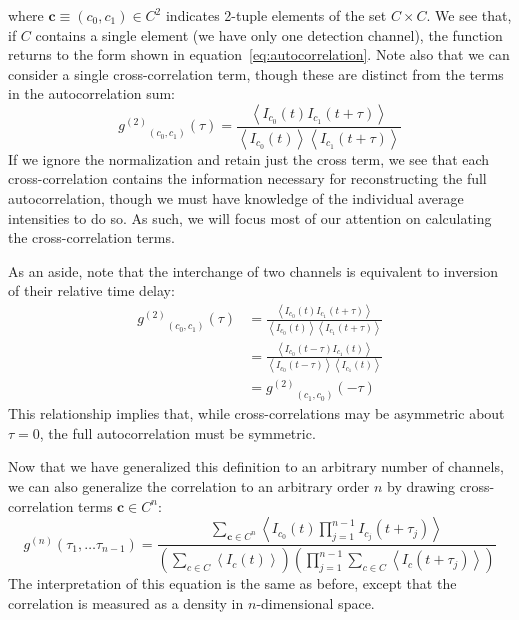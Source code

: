 \documentclass{article}
\newcommand{\angles}[1]{\ensuremath{\left\langle #1 \right\rangle}}
\newcommand{\gn}[1]{\ensuremath{g^{(#1)}}}
\renewcommand{\vec}{\boldsymbol}
\newcommand{\channel}{\ensuremath{c}}
\newcommand{\channels}{\ensuremath{C}}
\begin{document}
where $\vec{\channel}\equiv(\channel_{0},\channel_{1})\in\channels^{2}$ indicates 2-tuple elements of the set $\channels\times\channels$. We see that, if $\channels$ contains a single element (we have only one detection channel), the function returns to the form shown in equation~\ref{eq:autocorrelation}. Note also that we can consider a single cross-correlation term, though these are distinct from the terms in the autocorrelation sum:
\begin{equation}
\gn{2}_{(c_{0},c_{1})}(\tau)=\frac{\angles{I_{c_{0}}(t)I_{c_{1}}(t+\tau)}}
                                                {\angles{I_{c_{0}}(t)}\angles{I_{c_{1}}(t+\tau)}}
\end{equation}
If we ignore the normalization and retain just the cross term, we see that each cross-correlation contains the information necessary for reconstructing the full autocorrelation, though we must have knowledge of the individual average intensities to do so. As such, we will focus most of our attention on calculating the cross-correlation terms.

As an aside, note that the interchange of two channels is equivalent to inversion of their relative time delay:
\begin{align}
\gn{2}_{(c_{0},c_{1})}(\tau)&=\frac{\angles{I_{c_{0}}(t)I_{c_{1}}(t+\tau)}}
                                                {\angles{I_{c_{0}}(t)}\angles{I_{c_{1}}(t+\tau)}} \\
                            &=\frac{\angles{I_{c_{0}}(t-\tau)I_{c_{1}}(t)}}
                                                {\angles{I_{c_{0}}(t-\tau)}\angles{I_{c_{1}}(t)}} \\
                            &= \gn{2}_{(c_{1}, c_{0})}(-\tau)
\end{align}
This relationship implies that, while cross-correlations may be asymmetric about $\tau=0$, the full autocorrelation must be symmetric. 

Now that we have generalized this definition to an arbitrary number of channels, we can also generalize the correlation to an arbitrary order $n$ by drawing cross-correlation terms $\vec{\channel}\in\channels^{n}$:
\begin{equation}
\label{eq:gn}
\gn{n}(\tau_{1},\ldots\tau_{n-1}) = 
     \frac{\sum_{\vec{\channel}\in\channels^{n}}
                {\angles{I_{\channel_{0}}(t)\prod_{j=1}^{n-1}{I_{\channel_{j}}(t+\tau_{j})}}}}
     {\left(\sum_{\channel\in\channels}{\angles{I_{\channel}(t)}}\right)
      \left(\prod_{j=1}^{n-1}
                 {\sum_{\channel\in\channels}
                       {\angles{I_{\channel}(t+\tau_{j})}}}\right)}
\end{equation}
The interpretation of this equation is the same as before, except that the correlation is measured as a density in $n$-dimensional space.
\end{document}
